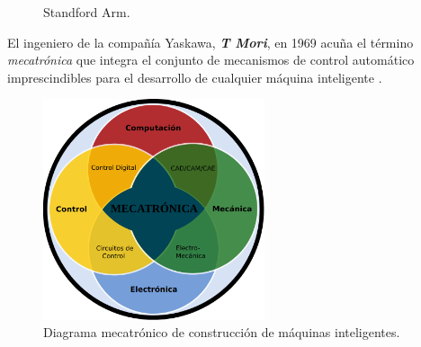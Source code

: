 \begin{itemize}
  \begin{figure}[h!]
    \begin{center}
      \subcapcentertrue
      \hspace{2mm}
    \end{center}
    \caption{Standford Arm.}
    \label{fig:standford_arm}
  \end{figure}

  El ingeniero de la compañía Yaskawa, \textbf{\emph{T Mori}}, en 1969 acuña el término \emph{mecatrónica} que integra el conjunto de mecanismos de control automático imprescindibles para el desarrollo de cualquier máquina inteligente \cite{Sanchez07b}.
  
  \begin{figure} [h!]
    \begin{center}
      \includegraphics[width=65mm]{figs/meca.png}
    \end{center}
    \caption{Diagrama mecatrónico de construcción de máquinas inteligentes.}
    \label{fig:Mecatrónica}
  \end{figure}
  

\end{itemize}
